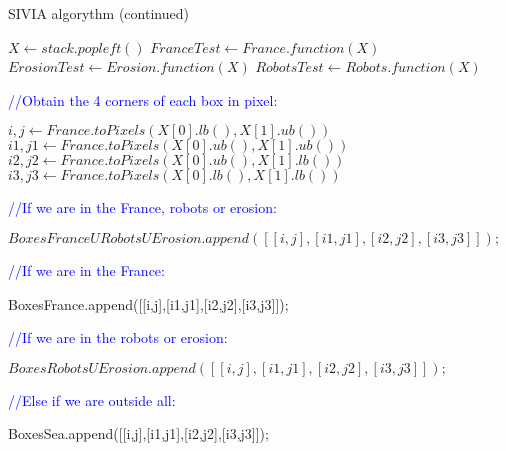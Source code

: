 \begin{algorithm}
  \caption{SIVIA algorythm (continued)}
  \begin{algorithmic}
  
	
		\vspace{0.3 cm}
	
  		\STATE $X\gets stack.popleft()$
		\STATE $FranceTest\gets France.function(X)$
		\STATE $ErosionTest\gets Erosion.function(X)$ 
		\STATE $RobotsTest\gets Robots.function(X)$

		\vspace{0.3 cm}

  		\textcolor{blue}{//Obtain the 4 corners of each box in pixel:}\
  		 
  		
  		\STATE $i,j\gets France.toPixels(X[0].lb(),X[1].ub())$
		\STATE $i1,j1\gets France.toPixels(X[0].ub(),X[1].ub())$
		\STATE $i2,j2\gets France.toPixels(X[0].ub(),X[1].lb())$ 
		\STATE $i3,j3\gets France.toPixels(X[0].lb(),X[1].lb())$
  
		\vspace{0.3 cm}
		
	 	\textcolor{blue}{//If we are in the France, robots or erosion:}\
	 	

     		\STATE $BoxesFranceURobotsUErosion.append([[i,j],[i1,j1],[i2,j2],[i3,j3]]);$
     		
     		\vspace{0.3 cm}
     	
     	\textcolor{blue}{//If we are in the France:}\
	 	 
     		\STATE BoxesFrance.append([[i,j],[i1,j1],[i2,j2],[i3,j3]]);
	 	\ENDIF
	 	
	 	\vspace{0.3 cm}
	 	
	 	\textcolor{blue}{//If we are in the robots or erosion:}\
	 	 
     		\STATE $BoxesRobotsUErosion.append([[i,j],[i1,j1],[i2,j2],[i3,j3]]);$
	 	 
	
	 	 \ENDIF
	 	 
	 	 \vspace{0.3 cm}
     		
     	

     	
     	\textcolor{blue}{//Else if we are outside all:}\
     
	 	 
	 	 \STATE BoxesSea.append([[i,j],[i1,j1],[i2,j2],[i3,j3]]);
	 	 

\end{algorithmic}
\end{algorithm}
